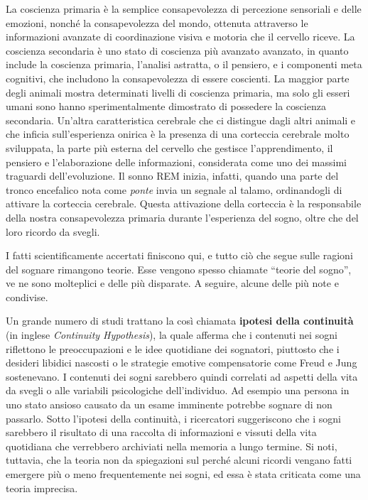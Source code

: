 La coscienza primaria è la semplice consapevolezza di percezione sensoriali e delle emozioni, nonché la consapevolezza
del mondo, ottenuta attraverso le informazioni avanzate di coordinazione visiva e motoria che il cervello riceve.
La coscienza secondaria è uno stato di coscienza più avanzato avanzato, in quanto include la coscienza primaria,
l'analisi astratta, o il pensiero, e i componenti meta cognitivi, che includono la consapevolezza di essere coscienti.
La maggior parte degli animali mostra determinati livelli di coscienza primaria, ma solo gli esseri umani sono
hanno sperimentalmente dimostrato di possedere la coscienza secondaria. %
Un'altra caratteristica cerebrale che ci distingue dagli altri animali e che inficia sull'esperienza
onirica è la presenza di una corteccia cerebrale molto sviluppata, la parte più esterna del cervello che
gestisce l'apprendimento, il pensiero e l'elaborazione delle informazioni, considerata come uno dei massimi
traguardi dell'evoluzione.
Il sonno REM inizia, infatti, quando una parte del tronco encefalico nota come \textit{ponte} invia un segnale al
talamo, ordinandogli di attivare la corteccia cerebrale.
Questa attivazione della corteccia è la responsabile della nostra consapevolezza primaria durante l'esperienza del
sogno, oltre che del loro ricordo da svegli. \newline

I fatti scientificamente accertati finiscono qui, e tutto ciò che segue sulle ragioni del sognare rimangono teorie.
Esse vengono spesso chiamate ``teorie del sogno'', ve ne sono molteplici e delle più disparate.
A seguire, alcune delle più note e condivise.


Un grande numero di studi trattano la così chiamata \textbf{ipotesi della continuità} (in inglese
\textit{Continuity Hypothesis}), la quale afferma che i contenuti nei sogni riflettono le preoccupazioni
e le idee quotidiane dei sognatori, piuttosto che i desideri libidici nascosti o le strategie emotive compensatorie
come Freud e Jung sostenevano.
I contenuti dei sogni sarebbero quindi correlati ad aspetti della vita da svegli o alle variabili psicologiche
dell'individuo.
Ad esempio una persona in uno stato ansioso causato da un esame imminente potrebbe sognare di non passarlo.
Sotto l'ipotesi della continuità, i ricercatori suggeriscono che i sogni sarebbero il risultato di una raccolta di
informazioni e vissuti della vita quotidiana che verrebbero archiviati nella memoria a lungo termine.
Si noti, tuttavia, che la teoria non da spiegazioni sul perché alcuni ricordi vengano
fatti emergere più o meno frequentemente nei sogni, ed essa è stata criticata come una teoria imprecisa.

